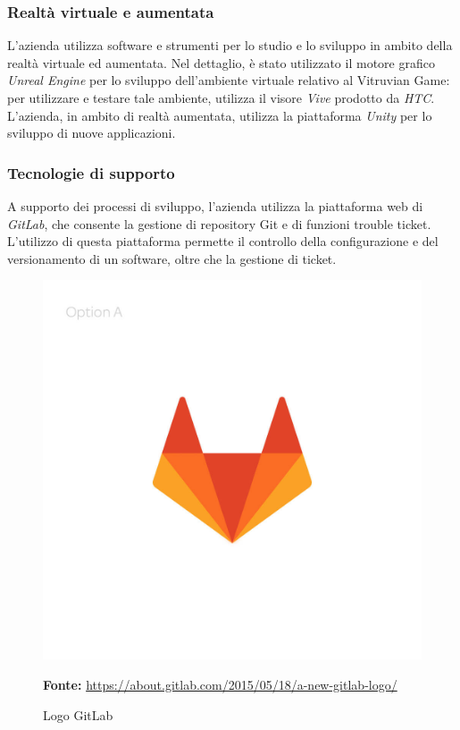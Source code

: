 \subsubsection{Realtà virtuale e aumentata}
L'azienda utilizza software e strumenti per lo studio e lo sviluppo in ambito della realtà virtuale ed aumentata.
Nel dettaglio, è stato utilizzato il motore grafico \textit{Unreal Engine} per lo sviluppo dell'ambiente virtuale relativo al Vitruvian Game: per utilizzare e testare tale ambiente, \lab{} utilizza il visore \textit{Vive} prodotto da \textit{HTC}.\\
L'azienda, in ambito di realtà aumentata, utilizza la piattaforma \textit{Unity} per lo sviluppo di nuove applicazioni.\\

\subsubsection{Tecnologie di supporto}
A supporto dei processi di sviluppo, l'azienda utilizza la piattaforma web di \textit{GitLab}, che consente la gestione di repository Git e di funzioni trouble ticket.\\
L'utilizzo di questa piattaforma permette il controllo della configurazione e del versionamento di un software, oltre che la gestione di ticket.

\begin{figure}[H]
	\begin{center}
	\includegraphics[scale=0.15]{immagini/gitlab.jpg}
	\caption{Logo GitLab}
	\small{\textbf{Fonte:} \url{https://about.gitlab.com/2015/05/18/a-new-gitlab-logo/}}
	\end{center}
\end{figure}

